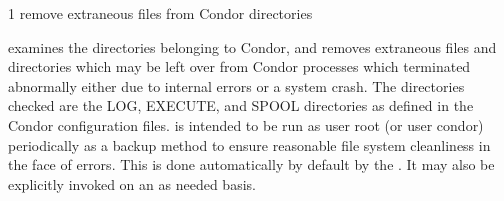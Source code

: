 \begin{ManPage}{\label{man-condor-preen}}{1}
{remove extraneous files from Condor directories}
\Synopsis {}

\Description 

 examines the directories belonging to Condor, 
and removes extraneous files and directories which may be left over from
Condor processes which terminated abnormally either due to internal errors or
a system crash. The directories checked are the LOG, EXECUTE, and SPOOL
directories as defined in the Condor configuration files.  is
intended to be run as user root (or user condor) periodically as a backup
method to ensure reasonable file system cleanliness in the face of
errors. This is done automatically by default by the . 
It may also be explicitly invoked on an as needed basis.

\begin{Options}




\end{Options}

\end{ManPage}
